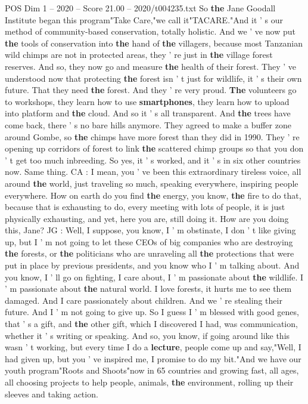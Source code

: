 \begin{textsample}{POS Dim 1 – 2020 – Score 21.00 – 2020/t004235.txt}
So \textbf{the} Jane Goodall Institute began this program"Take Care,"we call it"TACARE."And it ' s our method of community-based conservation, totally holistic.
And we ' ve now put \textbf{the} tools of conservation into \textbf{the} hand of \textbf{the} villagers, because most Tanzanian wild chimps are not in protected areas, they ' re just in \textbf{the} village forest reserves.
And so, they now go and measure \textbf{the} health of their forest.
They ' ve understood now that protecting \textbf{the} forest isn ' t just for wildlife, it ' s their own future.
That they need \textbf{the} forest.
And they ' re very proud. \textbf{The} volunteers go to workshops, they learn how to use \textbf{smartphones}, they learn how to upload into platform and \textbf{the} cloud.
And so it ' s all transparent.
And \textbf{the} trees have come back, there ' s no bare hills anymore.
They agreed to make a buffer zone around Gombe, so \textbf{the} chimps have more forest than they did in 1990.
They ' re opening up corridors of forest to link \textbf{the} scattered chimp groups so that you don ' t get too much inbreeding.
So yes, it ' s worked, and it ' s in six other countries now.
Same thing.
CA : I mean, you ' ve been this extraordinary tireless voice, all around \textbf{the} world, just traveling so much, speaking everywhere, inspiring people everywhere.
How on earth do you find \textbf{the} energy, you know, \textbf{the} fire to do that, because that is exhausting to do, every meeting with lots of people, it is just physically exhausting, and yet, here you are, still doing it.
How are you doing this, Jane?
JG : Well, I suppose, you know, I ' m obstinate, I don ' t like giving up, but I ' m not going to let these CEOs of big companies who are destroying \textbf{the} forests, or \textbf{the} politicians who are unraveling all \textbf{the} protections that were put in place by previous presidents, and you know who I ' m talking about.
And you know, I ' ll go on fighting, I care about, I ' m passionate about \textbf{the} wildlife.
I ' m passionate about \textbf{the} natural world.
I love forests, it hurts me to see them damaged.
And I care passionately about children.
And we ' re stealing their future.
And I ' m not going to give up.
So I guess I ' m blessed with good genes, that ' s a gift, and \textbf{the} other gift, which I discovered I had, was communication, whether it ' s writing or speaking.
And so, you know, if going around like this wasn ' t working, but every time I do a \textbf{lecture}, people come up and say,"Well, I had given up, but you ' ve inspired me, I promise to do my bit."And we have our youth program"Roots and Shoots"now in 65 countries and growing fast, all ages, all choosing projects to help people, animals, \textbf{the} environment, rolling up their sleeves and taking action.

\end{textsample}
